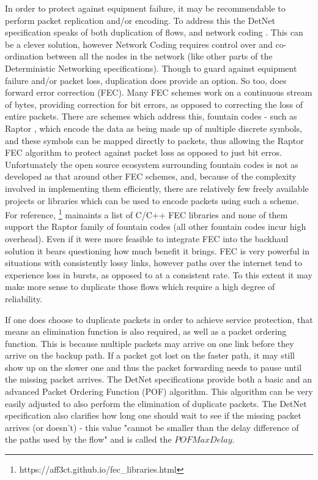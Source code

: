 In order to protect against equipment failure, it may be recommendable to perform packet replication and/or encoding. To address this the DetNet specification speaks of both duplication of flows, and network coding \cite{ahlswede2000network}. This can be a clever solution, however Network Coding requires control over and co-ordination between all the nodes in the network (like other parts of the Deterministic Networking specifications). Though to guard against equipment failure and/or packet loss, duplication does provide an option. So too, does forward error correction (FEC). Many FEC schemes work on a continuous stream of bytes, providing correction for bit errors, as opposed to correcting the loss of entire packets. There are schemes which address this, fountain codes - such as Raptor \cite{luby2007raptor}, which encode the data as being made up of multiple discrete symbols, and these symbols can be mapped directly to packets, thus allowing the Raptor FEC algorithm to protect against packet loss as opposed to just bit erros. Unfortunately the open source ecosystem surrounding fountain codes is not as developed as that around other FEC schemes, and, because of the complexity involved in implementing them efficiently, there are relatively few freely available projects or libraries which can be used to encode packets using such a scheme. For reference, \footnote{https://aff3ct.github.io/fec\_libraries.html} mainaints a list of C/C++ FEC libraries and none of them support the Raptor family of fountain codes (all other fountain codes incur high overhead). Even if it were more feasible to integrate FEC into the backhaul solution it bears questioning how much benefit it brings. FEC is very powerful in situations with consistently lossy links, however paths over the internet tend to experience loss in bursts, as opposed to at a consistent rate. To this extent it may make more sense to duplicate those flows which require a high degree of reliability. 


If one does choose to duplicate packets in order to achieve service protection, that means an elimination function is also required, as well as a packet ordering function. This is because multiple packets may arrive on one link before they arrive on the backup path. If a packet got lost on the faster path, it may still show up on the slower one and thus the packet forwarding needs to pause until the missing packet arrives. The DetNet specifications provide both a basic and an advanced Packet Ordering Function (POF) algorithm. This algorithm can be very easily adjusted to also perform the elimination of duplicate packets. The DetNet specification also clarifies how long one should wait to see if the missing packet arrives (or doesn't) - this value "cannot be smaller than the delay difference of the paths used by the flow" and is called the $POFMaxDelay$.

